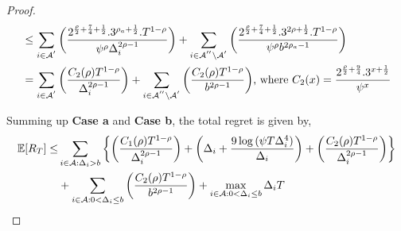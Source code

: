\begin{proof}
\begin{align*}
&\leq\sum_{i\in \mathcal{A}^{'}}\bigg(\dfrac{2^{\frac{\rho}{2}+\frac{7}{4}+\frac{1}{2}}.3^{\rho_{a}+\frac{1}{2}}.T^{1-\rho } }{\psi^{\rho}\Delta_{i}^{2\rho -1}} \bigg)+\sum_{i\in \mathcal{A}^{''}\setminus \mathcal{A}^{'}}\bigg(\dfrac{2^{\frac{\rho}{2}+\frac{7}{4}+\frac{1}{2}}.3^{2\rho+\frac{1}{2}}.T^{1-\rho} }{\psi^{\rho }b^{2\rho_{a}-1}} \bigg)\\
& = \sum_{i\in \mathcal{A}^{'}}\bigg(\dfrac{ C_{2}(\rho) T^{1-\rho}}{\Delta_{i}^{2\rho-1}} \bigg)+\sum_{i\in \mathcal{A}^{''}\setminus \mathcal{A}^{'}}\bigg(\dfrac{C_{2}(\rho)T^{1-\rho}}{b^{2\rho -1}} \bigg) \text{, where } C_2(x) = \frac{2^{\frac{\rho}{2}+\frac{9}{4}}.3^{x+\frac{1}{2}}}{\psi^{x}}
\end{align*}
%
 
Summing up \textbf{Case a} and \textbf{Case b}, the total regret is given by,
\begin{align*}
 \mathbb{E} [R_{T}] \leq &\sum\limits_{i\in \mathcal{A} :\Delta_{i} > b}\bigg\lbrace\bigg(\dfrac{C_{1}(\rho)T^{1-\rho}}{\Delta_{i}^{2\rho -1}}\bigg) + \bigg(\Delta_{i}+\dfrac{9\log{(\psi  T\Delta_{i}^{4})}}{\Delta_{i}}\bigg) + \bigg(\dfrac{ C_{2}(\rho) T^{1-\rho}}{\Delta_{i}^{2\rho-1}} \bigg)\bigg \rbrace\\ 
  & +\sum\limits_{i\in \mathcal{A} :0 < \Delta_{i}\leq b}\bigg(\dfrac{C_{2}(\rho)T^{1-\rho}}{b^{2\rho -1}} \bigg) + \max_{i\in \mathcal{A} :0 < \Delta_{i}\leq b}\Delta_{i}T
\end{align*}
\end{proof}

